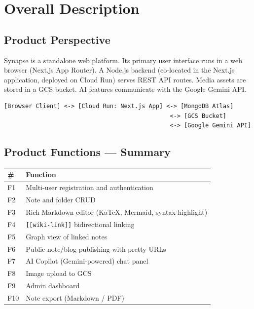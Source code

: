 \documentclass[12pt, a4paper]{article}
\begin{document}
\section{Overall Description}
\label{sec:overall}

\subsection{Product Perspective}

Synapse is a standalone web platform. Its primary user interface runs in a
web browser (Next.js App Router). A Node.js backend (co-located in the
Next.js application, deployed on Cloud Run) serves REST API routes. Media
assets are stored in a GCS bucket. AI features communicate with the Google
Gemini API.

\begin{lstlisting}[title={High-level system topology}]
[Browser Client] <-> [Cloud Run: Next.js App] <-> [MongoDB Atlas]
                                               <-> [GCS Bucket]
                                               <-> [Google Gemini API]
\end{lstlisting}

\subsection{Product Functions — Summary}

\begin{longtable}{@{}C{1.2cm} L{11cm}@{}}
  \toprule
  \textbf{\#} & \textbf{Function} \\
  \midrule\endhead
  \bottomrule\endfoot
  F1  & Multi-user registration and authentication \\
  F2  & Note and folder CRUD \\
  F3  & Rich Markdown editor (KaTeX, Mermaid, syntax highlight) \\
  F4  & \texttt{[[wiki-link]]} bidirectional linking \\
  F5  & Graph view of linked notes \\
  F6  & Public note/blog publishing with pretty URLs \\
  F7  & AI Copilot (Gemini-powered) chat panel \\
  F8  & Image upload to GCS \\
  F9  & Admin dashboard \\
  F10 & Note export (Markdown / PDF) \\
\end{longtable}
\end{document}
